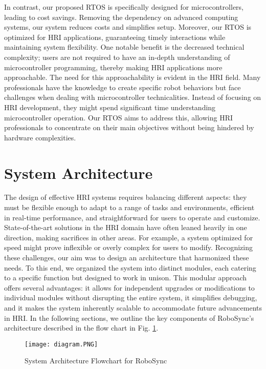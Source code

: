 \documentclass[runningheads]{llncs}
\begin{document}
In contrast, our proposed RTOS is specifically designed for microcontrollers, leading to cost savings. Removing the dependency on advanced computing systems, our system reduces costs and simplifies setup. Moreover, our RTOS is optimized for HRI applications, guaranteeing timely interactions while maintaining system flexibility. One notable benefit is the decreased technical complexity; users are not required to have an in-depth understanding of microcontroller programming, thereby making HRI applications more approachable. The need for this approachability is evident in the HRI field. Many professionals have the knowledge to create specific robot behaviors but face challenges when dealing with microcontroller technicalities. Instead of focusing on HRI development, they might spend significant time understanding microcontroller operation. Our RTOS aims to address this, allowing HRI professionals to concentrate on their main objectives without being hindered by hardware complexities.

\section{System Architecture}

The design of effective HRI systems requires balancing different aspects: they must be flexible enough to adapt to a range of tasks and environments, efficient in real-time performance, and straightforward for users to operate and customize. State-of-the-art solutions in the HRI domain have often leaned heavily in one direction, making sacrifices in other areas. For example, a system optimized for speed might prove inflexible or overly complex for users to modify. Recognizing these challenges, our aim was to design an architecture that harmonized these needs. 
To this end, we organized the system into distinct modules, each catering to a specific function but designed to work in unison. This modular approach offers several advantages: it allows for independent upgrades or modifications to individual modules without disrupting the entire system, it simplifies debugging, and it makes the system inherently scalable to accommodate future advancements in HRI. 
In the following sections, we outline the key components of RoboSync's architecture described in the flow chart in Fig. \ref{fig:flowchart}. 

\begin{figure}[!htb]
    \centering
    \texttt{[image: diagram.PNG]}
    \caption{System Architecture Flowchart for RoboSync}
    \label{fig:flowchart}
\end{figure}
\end{document}

